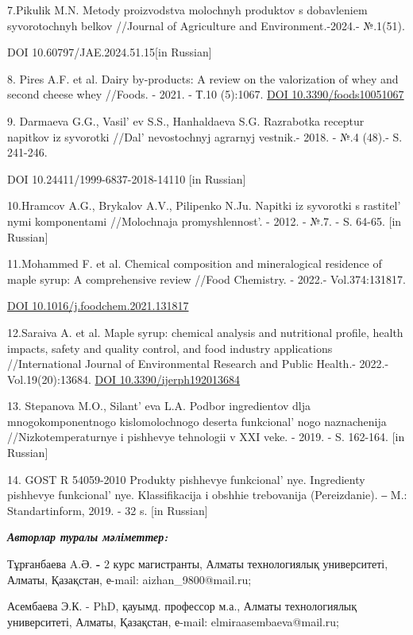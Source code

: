 {{7.Pikulik M.N. Metody proizvodstva molochnyh produktov s dobavleniem
syvorotochnyh belkov //Journal of Agriculture and Environment.-2024.-
№.1(51).

DOI 10.60797/JAE.2024.51.15{[}in Russian{]}

8. Pires A.F. et al. Dairy by-products: A review on the valorization of
whey and second cheese whey //Foods. - 2021. - Т.10 (5):1067.
\href{https://doi.org/10.3390/foods10051067}{DOI 10.3390/foods10051067}

9. Darmaeva G.G., Vasil' ev S.S., Hanhaldaeva S.G.
Razrabotka receptur napitkov iz syvorotki
//Dal' nevostochnyj agrarnyj vestnik.- 2018. - №.4 (48).-
S. 241-246.

DOI 10.24411/1999-6837-2018-14110 {[}in Russian{]}

10.Hramcov A.G., Brykalov A.V., Pilipenko N.Ju. Napitki iz syvorotki s
rastitel' nymi komponentami //Molochnaja
promyshlennost'. - 2012. - №.7. - S. 64-65. {[}in
Russian{]}

11.Mohammed F. et al. Chemical composition and mineralogical residence
of maple syrup: A comprehensive review //Food Chemistry. - 2022.-
Vol.374:131817.

\href{https://doi.org/10.1016/j.foodchem.2021.131817}{DOI
10.1016/j.foodchem.2021.131817}

12.Saraiva A. et al. Maple syrup: chemical analysis and nutritional
profile, health impacts, safety and quality control, and food industry
applications //International Journal of Environmental Research and
Public Health.- 2022.-Vol.19(20):13684.
\href{https://doi.org/10.3390/ijerph192013684}{DOI
10.3390/ijerph192013684}

13. Stepanova M.O., Silant' eva L.A. Podbor ingredientov
dlja mnogokomponentnogo kislomolochnogo deserta
funkcional' nogo naznachenija //Nizkotemperaturnye i
pishhevye tehnologii v XXI veke. - 2019. - S. 162-164. {[}in Russian{]}

14. GOST R 54059-2010 Produkty pishhevye funkcional' nye.
Ingredienty pishhevye funkcional' nye. Klassifikacija i
obshhie trebovanija (Pereizdanie). ‒ M.: Standartinform, 2019. - 32 s.
{[}in Russian{]}

\emph{{\bfseries Авторлар туралы мәліметтер:}}

Тұрғанбаева A.Ә. {\bfseries -} 2 курс магистранты, Алматы технологиялық
университеті, Алматы, Қазақстан, е-mail: aizhan\_9800@mail.ru;

Асембаева Э.К. - PhD, қауымд. профессор м.а., Алматы технологиялық
университеті, Алматы, Қазақстан, е-mail: elmiraasembaeva@mail.ru;

}}
